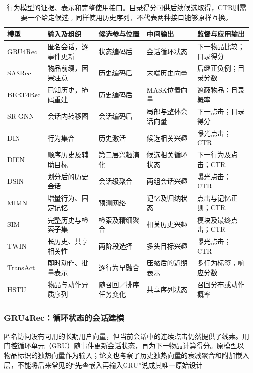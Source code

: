 \begin{table}[htbp]
  \centering
  \small
  \renewcommand{\arraystretch}{1.15}
  \begin{tabularx}{\linewidth}{@{}lXXXX@{}}
    \toprule
    模型 & 输入及组织 & 候选参与位置 & 中间输出 & 监督与应用输出 \\
    \midrule
    GRU4Rec & 匿名会话，逐事件更新 & 状态编码后 & 会话循环状态 & 下一物品比较；目录得分 \\
    SASRec & 物品前缀，因果注意 & 历史编码后 & 末端历史向量 & 后继正负例；目录分数 \\
    BERT4Rec & 已知历史，掩码重建 & 历史编码后 & MASK位置向量 & 遮蔽物品；目录概率 \\
    SR-GNN & 会话内转移图 & 会话编码后 & 局部与整体会话向量 & 下一点击；目录得分 \\
    DIN & 行为集合 & 历史激活 & 候选相关兴趣 & 曝光点击；CTR \\
    DIEN & 顺序历史及辅助目标 & 第二层兴趣演化 & 候选相关循环状态 & 下一行为及点击；CTR \\
    DSIN & 划分后的历史会话 & 会话级聚合 & 两组会话兴趣 & 曝光点击；CTR \\
    MIMN & 增量行为、固定记忆 & 预测网络 & 记忆及归纳状态 & 点击与记忆正则；CTR \\
    SIM & 完整历史与检索子集 & 检索及精细聚合 & 相关历史兴趣 & 模块及最终点击；CTR \\
    TWIN & 长历史、共享相关性 & 两阶段选择 & 多头目标兴趣 & 曝光点击；CTR \\
    TransAct & 即时动作、批量表示 & 逐行为早融合 & 压缩后的近期表示 & 多行为标签；响应分数 \\
    HSTU & 物品与动作异质序列 & 随召回／排序任务变化 & 共享序列状态 & 召回分布或动作概率 \\
    \bottomrule
  \end{tabularx}
  \caption{行为模型的证据、表示和完整使用接口。目录得分可供后续候选取得，CTR则需要一个给定候选；同样使用历史序列，不代表两种接口能够原样互换。}
  \label{tab:rs-behavior-models}
\end{table}

\subsubsection{GRU4Rec：循环状态的会话建模}
\label{sec:rs-gru4rec}

匿名访问没有可用的长期用户向量，但当前会话中的连续点击仍然提供了线索。用门控循环单元（GRU）随事件更新会话状态，再为下一物品计算得分。原模型以物品标识的独热向量作为输入；论文也考察了历史独热向量的衰减聚合和附加嵌入层，不能将后来常见的“先查嵌入再输入GRU”说成其唯一原始设计

